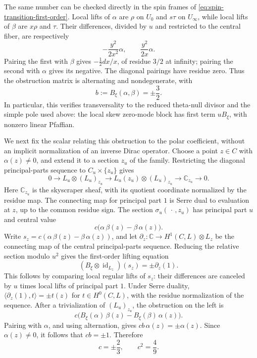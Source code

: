 \documentclass[10pt,a4paper]{amsart}
\begin{document}
The same number can be checked directly in the spin frames of
\eqref{eq:spin-transition-first-order}. Local lifts of $\alpha$ are
$\rho$ on $U_0$ and $s\tau$ on $U_\infty$, while local lifts of
$\beta$ are $x\rho$ and $\tau$. Their differences, divided by $u$
and restricted to the central fiber, are respectively
\[
-\frac{y^2}{2x^2}\alpha,
\qquad \frac{y^2}{2x}\alpha.
\]
Pairing the first with $\beta$ gives $-\tfrac12dx/x$, of residue
$3/2$ at infinity; pairing the second with $\alpha$ gives its
negative. The diagonal pairings have residue zero. Thus the
obstruction matrix is alternating and nondegenerate, with
\[
b:=B_\xi(\alpha,\beta)=\pm\frac32.
\]
In particular, this verifies transversality to the reduced theta-null
divisor and the simple pole used above: the local skew zero-mode
block has first term $uB_\xi$, with nonzero linear Pfaffian.

\begingroup
We next fix the scalar relating this obstruction to the polar
coefficient, without an implicit normalization of an inverse Dirac
operator. Choose a point $z\in C$ with $\alpha(z)\neq0$, and extend
it to a section $z_u$ of the family. Restricting the diagonal
principal-parts sequence to $C_u\times\{z_u\}$ gives
\[
0\longrightarrow L_u\otimes(L_u)_{z_u}
\longrightarrow L_u(z_u)\otimes(L_u)_{z_u}
\longrightarrow\mathbb C_{z_u}\longrightarrow0.
\]
Here $\mathbb C_{z_u}$ is the skyscraper sheaf, with its quotient
coordinate normalized by the residue map. The connecting map for
principal part $1$ is Serre dual to evaluation at $z$, up to the
common residue sign. The section $\sigma_u(\,\cdot\,,z_u)$ has
principal part $u$ and central value
\[
c\bigl(\alpha\,\beta(z)-\beta\,\alpha(z)\bigr).
\]
Write $s_z=c(\alpha\,\beta(z)-\beta\,\alpha(z))$, and let
$\partial_z:\mathbb C\to H^1(C,L)\otimes L_z$ be the connecting map
of the central principal-parts sequence. Reducing the relative section
modulo $u^2$ gives the first-order lifting equation
\[
(B_\xi\otimes\operatorname{id}_{L_z})(s_z)=\pm\partial_z(1).
\]
This follows by comparing local regular lifts of $s_z$: their
differences are canceled by $u$ times local lifts of principal part $1$.
Under Serre duality, $\langle\partial_z(1),t\rangle=\pm t(z)$
for $t\in H^0(C,L)$, with the residue normalization of the sequence.
After a trivialization of $(L_u)_{z_u}$, the obstruction on the left is
\[
c\bigl(B_\xi(\alpha)\,\beta(z)
-B_\xi(\beta)\,\alpha(z)\bigr).
\]
Pairing with $\alpha$, and using alternation, gives
$cb\,\alpha(z)=\pm\alpha(z)$. Since $\alpha(z)\neq0$, it follows
that $cb=\pm1$. Therefore
\begin{equation}
\label{eq:c-value}
c=\pm\frac23,\qquad c^2=\frac49.
\end{equation}
\endgroup
\end{document}
